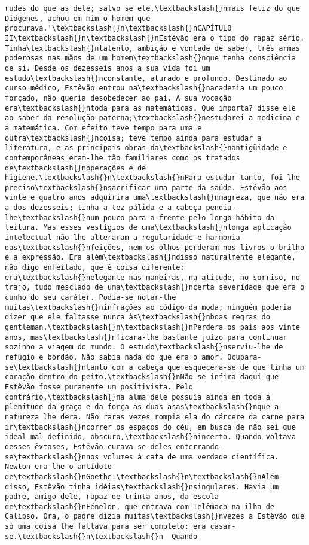 \begin{Verbatim}[commandchars=\\\{\}]
rudes do que as dele; salvo se ele,\textbackslash{}nmais feliz do que Diógenes, achou em mim o homem que procurava.'\textbackslash{}n\textbackslash{}nCAPÍTULO II\textbackslash{}n\textbackslash{}nEstêvão era o tipo do rapaz sério. Tinha\textbackslash{}ntalento, ambição e vontade de saber, três armas poderosas nas mãos de um homem\textbackslash{}nque tenha consciência de si. Desde os dezesseis anos a sua vida foi um estudo\textbackslash{}nconstante, aturado e profundo. Destinado ao curso médico, Estêvão entrou na\textbackslash{}nacademia um pouco forçado, não queria desobedecer ao pai. A sua vocação era\textbackslash{}ntoda para as matemáticas. Que importa? disse ele ao saber da resolução paterna;\textbackslash{}nestudarei a medicina e a matemática. Com efeito teve tempo para uma e outra\textbackslash{}ncoisa; teve tempo ainda para estudar a literatura, e as principais obras da\textbackslash{}nantigüidade e contemporâneas eram-lhe tão familiares como os tratados de\textbackslash{}noperações e de higiene.\textbackslash{}n\textbackslash{}nPara estudar tanto, foi-lhe preciso\textbackslash{}nsacrificar uma parte da saúde. Estêvão aos vinte e quatro anos adquirira uma\textbackslash{}nmagreza, que não era a dos dezesseis; tinha a tez pálida e a cabeça pendia-lhe\textbackslash{}num pouco para a frente pelo longo hábito da leitura. Mas esses vestígios de uma\textbackslash{}nlonga aplicação intelectual não lhe alteraram a regularidade e harmonia das\textbackslash{}nfeições, nem os olhos perderam nos livros o brilho e a expressão. Era além\textbackslash{}ndisso naturalmente elegante, não digo enfeitado, que é coisa diferente: era\textbackslash{}nelegante nas maneiras, na atitude, no sorriso, no trajo, tudo mesclado de uma\textbackslash{}ncerta severidade que era o cunho do seu caráter. Podia-se notar-lhe muitas\textbackslash{}ninfrações ao código da moda; ninguém poderia dizer que ele faltasse nunca às\textbackslash{}nboas regras do gentleman.\textbackslash{}n\textbackslash{}nPerdera os pais aos vinte anos, mas\textbackslash{}nficara-lhe bastante juízo para continuar sozinho a viagem do mundo. O estudo\textbackslash{}nserviu-lhe de refúgio e bordão. Não sabia nada do que era o amor. Ocupara-se\textbackslash{}ntanto com a cabeça que esquecera-se de que tinha um coração dentro do peito.\textbackslash{}nNão se infira daqui que Estêvão fosse puramente um positivista. Pelo contrário,\textbackslash{}na alma dele possuía ainda em toda a plenitude da graça e da força as duas asas\textbackslash{}nque a natureza lhe dera. Não raras vezes rompia ela do cárcere da carne para ir\textbackslash{}ncorrer os espaços do céu, em busca de não sei que ideal mal definido, obscuro,\textbackslash{}nincerto. Quando voltava desses êxtases, Estêvão curava-se deles enterrando-se\textbackslash{}nnos volumes à cata de uma verdade científica. Newton era-lhe o antídoto de\textbackslash{}nGoethe.\textbackslash{}n\textbackslash{}nAlém disso, Estêvão tinha idéias\textbackslash{}nsingulares. Havia um padre, amigo dele, rapaz de trinta anos, da escola de\textbackslash{}nFénelon, que entrava com Telêmaco na ilha de Calipso. Ora, o padre dizia muitas\textbackslash{}nvezes a Estêvão que só uma coisa lhe faltava para ser completo: era casar-se.\textbackslash{}n\textbackslash{}n— Quando 
\end{Verbatim}
